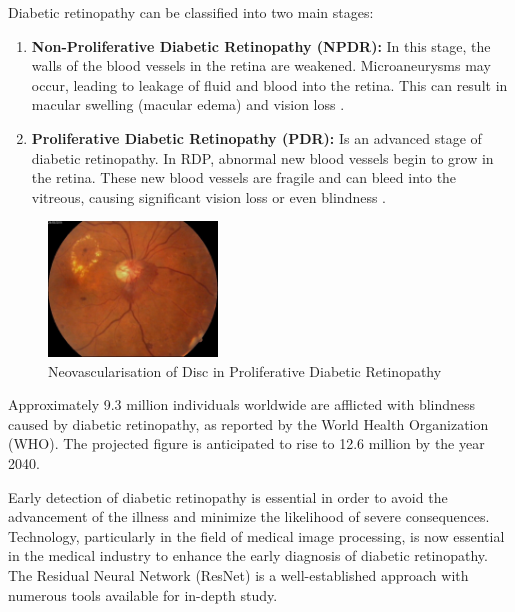 Diabetic retinopathy can be classified into two main stages:

\begin{enumerate}
    \item \textbf{Non-Proliferative Diabetic Retinopathy (NPDR):} In this stage, the walls of the blood vessels in the retina are weakened. Microaneurysms may occur, leading to leakage of fluid and blood into the retina. This can result in macular swelling (macular edema) and vision loss \citet{aiello1998diabetic}.
    \item \textbf{Proliferative Diabetic Retinopathy (PDR):} Is an advanced stage of diabetic retinopathy. In RDP, abnormal new blood vessels begin to grow in the retina. These new blood vessels are fragile and can bleed into the vitreous, causing significant vision loss or even blindness \citet{king1998diabetes}.
\end{enumerate}

\begin{figure}[hbtp] \centering
    \includegraphics[width=0.4\textwidth]{gambar/PDR figure.jpg}
	\caption{Neovascularisation of Disc in Proliferative Diabetic Retinopathy \citet{Shukla2023-tq}}
	\label{fig:gambarPDR}
\end{figure}

Approximately 9.3 million individuals worldwide are afflicted with blindness caused by diabetic retinopathy, as reported by the World Health Organization (WHO). The projected figure is anticipated to rise to 12.6 million by the year 2040.

Early detection of diabetic retinopathy is essential in order to avoid the advancement of the illness and minimize the likelihood of severe consequences. Technology, particularly in the field of medical image processing, is now essential in the medical industry to enhance the early diagnosis of diabetic retinopathy. The Residual Neural Network (ResNet) is a well-established approach with numerous tools available for in-depth study.

